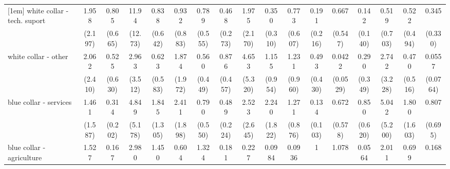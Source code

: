 {\begin{tabular}{l*{16}{c}}
[1em]
white collar - tech. suport&       1.958         &       0.805         &       11.94\sym{*}  &       0.838         &       0.932         &       0.789         &       0.468         &       1.975         &       0.350         &       0.773         &       0.191         &       0.667         &       0.142\sym{*}  &       0.519         &       0.522         &       0.345         \\
                    &     (2.197)         &     (0.665)         &     (12.73)         &     (0.642)         &     (0.883)         &     (0.555)         &     (0.273)         &     (2.170)         &     (0.310)         &     (0.607)         &     (0.216)         &     (0.547)         &     (0.140)         &     (0.703)         &     (0.494)         &     (0.330)         \\
[1em]
white collar - other&       2.062         &       0.525         &       2.963         &       0.623         &       1.874         &       0.560         &       0.876         &       4.653         &       1.155         &       1.231         &       0.493         &      0.0422\sym{*}  &       0.290         &       2.742         &       0.470         &      0.0557\sym{*}  \\
                    &     (2.410)         &     (0.630)         &     (3.512)         &     (0.583)         &     (1.972)         &     (0.449)         &     (0.457)         &     (5.320)         &     (0.954)         &     (0.960)         &     (0.430)         &    (0.0529)         &     (0.349)         &     (3.228)         &     (0.516)         &    (0.0764)         \\
[1em]
blue collar - services&       1.461         &       0.314         &       4.849         &       1.845         &       2.411         &       0.790         &       0.489         &       2.523         &       2.240         &       1.271         &       0.134\sym{**} &       0.672         &       0.850         &       5.042         &       1.800         &       0.807         \\
                    &     (1.587)         &     (0.202)         &     (5.178)         &     (1.305)         &     (1.898)         &     (0.550)         &     (0.224)         &     (2.645)         &     (1.822)         &     (0.876)         &     (0.103)         &     (0.578)         &     (0.620)         &     (5.200)         &     (1.603)         &     (0.695)         \\
[1em]
blue collar - agriculture&       1.527         &       0.167         &       2.980         &       1.450         &       0.604         &       1.324         &       0.181\sym{*}  &       0.227         &      0.0984         &      0.0936\sym{*}  &           1         &       1.078         &      0.0564\sym{*}  &       2.011         &       0.699         &       0.168         \\

\end{tabular}}
